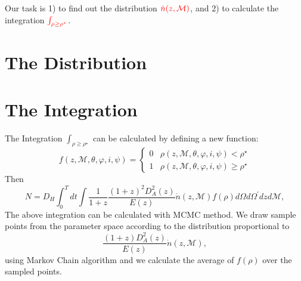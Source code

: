 \documentclass[fleqn,usenatbib]{mnras}
\begin{document}
Our task is 1) to find out the distribution $\textcolor{red}{\dot{n}(z,\mathcal{M})}$, and 2) to calculate the integration $\textcolor{red}{\int_{\rho\ge\rho^\star}}$. 
\section{The Distribution}
\section{The Integration}
The Integration $\int_{\rho\ge\rho^\star}$ can be calculated by defining a new function:
\begin{equation}
f(z,\mathcal{M},\theta,\varphi,i,\psi)=
    \begin{cases} 
      0 & \rho(z,\mathcal{M},\theta,\varphi,i,\psi)<\rho^\star \\
      1 & \rho(z,\mathcal{M},\theta,\varphi,i,\psi)\ge\rho^\star
    \end{cases}
\end{equation}
Then
\begin{equation}
    N=D_H\int^T_0dt\int\frac{1}{1+z}\frac{(1+z)^2D^2_A(z)}{E(z)}\dot{n}(z,\mathcal{M})f(\rho)d\Omega d\Omega^\prime dzd\mathcal{M},
\end{equation}
The above integration can be calculated with MCMC method. We draw sample points from the parameter space according to the distribution proportional to 
\begin{equation}
    \frac{(1+z)D^2_A(z)}{E(z)}\dot{n}(z,\mathcal{M}),
\end{equation}
using Markov Chain algorithm and we calculate the average of $f(\rho)$ over the sampled points. 
\end{document}
